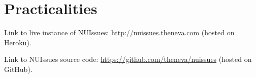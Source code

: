 \section{Practicalities}

Link to live instance of NUIssues: \url{http://nuissues.theneva.com} (hosted on Heroku).

Link to NUIssues source code: \url{https://github.com/theneva/nuissues} (hosted on GitHub).
